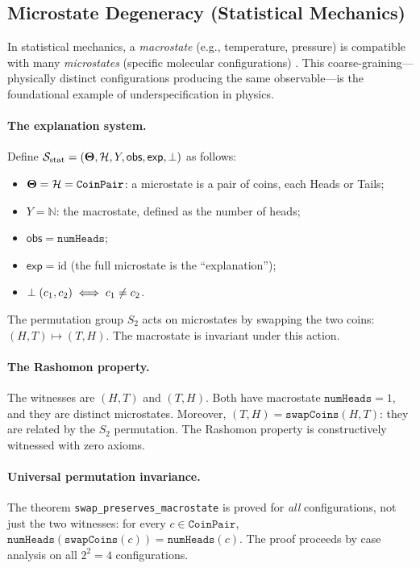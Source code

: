 \subsection{Microstate Degeneracy (Statistical Mechanics)}
\label{sec:instance-stat-mech}

In statistical mechanics, a \emph{macrostate} (e.g., temperature, pressure)
is compatible with many \emph{microstates} (specific molecular configurations)
\citep{jaynes1957information}.
This coarse-graining---physically distinct configurations producing the same
observable---is the foundational example of underspecification in physics.

\paragraph{The explanation system.}
Define $\mathcal{S}_{\mathrm{stat}} = (\mathbf{\Theta}, \mathcal{H}, Y, \mathsf{obs},
\mathsf{exp}, \perp)$ as follows:
\begin{itemize}
  \item $\mathbf{\Theta} = \mathcal{H} = \texttt{CoinPair}$: a microstate is a pair of coins,
    each Heads or Tails;
  \item $Y = \mathbb{N}$: the macrostate, defined as the number of heads;
  \item $\mathsf{obs} = \texttt{numHeads}$;
  \item $\mathsf{exp} = \mathrm{id}$ (the full microstate is the
    ``explanation'');
  \item $\perp(c_1, c_2) \iff c_1 \ne c_2$.
\end{itemize}

The permutation group $S_2$ acts on microstates by swapping the two coins:
$(H,T) \mapsto (T,H)$.  The macrostate is invariant under this action.

\paragraph{The Rashomon property.}
The witnesses are $(H,T)$ and $(T,H)$.  Both have macrostate $\texttt{numHeads} = 1$,
and they are distinct microstates.  Moreover, $(T,H) = \texttt{swapCoins}(H,T)$:
they are related by the $S_2$ permutation.  The Rashomon property is constructively
witnessed with zero axioms.

\paragraph{Universal permutation invariance.}
The theorem \texttt{swap\_preserves\_macrostate} is proved for \emph{all}
configurations, not just the two witnesses: for every $c \in \texttt{CoinPair}$,
$\texttt{numHeads}(\texttt{swapCoins}(c)) = \texttt{numHeads}(c)$.  The proof
proceeds by case analysis on all $2^2 = 4$ configurations.

